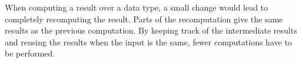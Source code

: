 
When computing a result over a data type, a small change would lead to completely recomputing the result. Parts of the recomputation give the same results as the previous computation. By keeping track of the intermediate results and reusing the results when the input is the same, fewer computations have to be performed. 